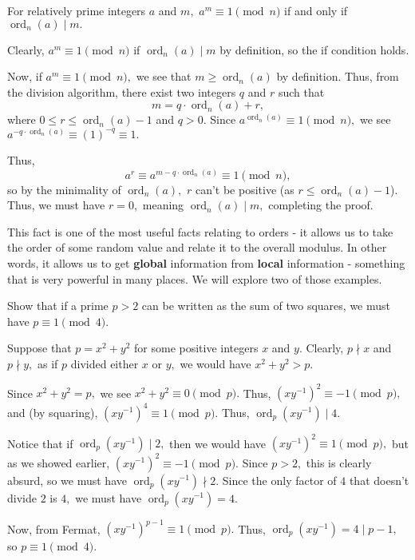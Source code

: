 \documentclass{article}
\begin{document}
\begin{fact}
For relatively prime integers $a$ and $m,$ $a^m \equiv 1 \pmod{n}$ if and only if $\operatorname{ord}_n(a) \mid m.$
\end{fact}

\begin{pro}
Clearly, $a^m \equiv 1 \pmod{n}$ if $\operatorname{ord}_n(a) \mid m$ by definition, so the if condition holds.

Now, if $a^m \equiv 1 \pmod{n},$ we see that $m \ge \operatorname{ord}_n(a)$ by definition. Thus, from the division algorithm, there exist two integers $q$ and $r$ such that \[m = q \cdot \operatorname{ord}_n(a)+r,\] where $0 \le r \le \operatorname{ord}_n(a)-1$ and $q>0.$ Since $a^{\operatorname{ord}_n(a)} \equiv 1 \pmod{n},$ we see $a^{-q \cdot \operatorname{ord}_n(a)} \equiv (1)^{-q} \equiv 1.$

Thus, $$a^r \equiv a^{m - q \cdot \operatorname{ord}_n(a)} \equiv 1 \pmod{n},$$ so by the minimality of $\operatorname{ord}_n(a),$ $r$ can't be positive (as $r \le \operatorname{ord}_n(a)-1$). Thus, we must have $r=0,$ meaning $\operatorname{ord}_n(a) \mid m,$ completing the proof.
\end{pro}

This fact is one of the most useful facts relating to orders - it allows us to take the order of some random value and relate it to the overall modulus. In other words, it allows us to get \textbf{global} information from \textbf{local} information - something that is very powerful in many places. We will explore two of those examples.

\begin{exam}
Show that if a prime $p>2$ can be written as the sum of two squares, we must have $p \equiv 1 \pmod{4}.$
\end{exam}

\begin{sol}
Suppose that $p = x^2+y^2$ for some positive integers $x$ and $y.$ Clearly, $p \nmid x$ and $p \nmid y,$ as if $p$ divided either $x$ or $y,$ we would have $x^2+y^2 > p.$

Since $x^2+y^2 = p,$ we see $x^2 + y^2 \equiv 0 \pmod{p}.$ Thus, $(x y^{-1})^2 \equiv -1 \pmod{p},$ and (by squaring), $(xy^{-1})^4 \equiv 1 \pmod{p}.$ Thus, $\operatorname{ord}_p(xy^{-1}) \mid 4.$

Notice that if $\operatorname{ord}_p(xy^{-1}) \mid 2,$ then we would have $(xy^{-1})^2 \equiv 1 \pmod{p},$ but as we showed earlier, $(xy^{-1})^2 \equiv -1 \pmod{p}.$ Since $p > 2,$ this is clearly absurd, so we must have $\operatorname{ord}_p(xy^{-1}) \nmid 2.$ Since the only factor of $4$ that doesn't divide $2$ is $4,$ we must have $\operatorname{ord}_p(xy^{-1}) = 4.$

Now, from Fermat, $(xy^{-1})^{p-1} \equiv 1 \pmod{p}.$ Thus, $\operatorname{ord}_p(xy^{-1}) = 4 \mid p-1,$ so $p \equiv 1 \pmod{4}.$
\end{sol}
\end{document}
